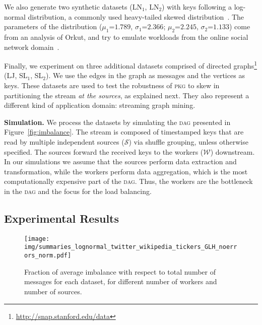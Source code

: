 \documentclass[10pt,conference,letterpaper]{IEEEtran}
\newcommand{\spara}[1]{\smallskip\noindent\textbf{#1}}
\newcommand{\dagr}{\textsc{dag}\xspace}
\newcommand{\pkgs}{\textsc{pkg}\xspace}
\newcommand{\sources}{\ensuremath{\mathcal{S}}\xspace}
\newcommand{\workers}{\ensuremath{\mathcal{W}}\xspace}
\begin{document}
We also generate two synthetic datasets (LN$_1$, LN$_2$) with keys following a log-normal distribution, a commonly used heavy-tailed skewed distribution~\citep{talwar2007weightedcase}.
The parameters of the distribution ($\mu_1$=$1.789$, $\sigma_1$=$2.366$; $\mu_2$=$2.245$, $\sigma_2$=$1.133$) come from an analysis of Orkut, and try to emulate workloads from the online social network domain~\cite{benevenuto09characterizingusers}.


Finally, we experiment on three additional datasets comprised of directed graphs\footnote{\url{http://snap.stanford.edu/data}} (LJ, SL$_1$, SL$_2$).
We use the edges in the graph as messages and the vertices as keys. These datasets are used to test the robustness of \pkgs to skew in partitioning the stream \emph{at the sources}, as explained next.
They also represent a different kind of application domain: streaming graph mining.






\spara{Simulation.}
We process the datasets by simulating the \dagr presented in Figure~\ref{fig:imbalance}.
The stream is composed of timestamped keys that are read by multiple independent sources (\sources) via shuffle grouping, unless otherwise specified.
The sources forward the received keys to the workers (\workers) downstream.
In our simulations we assume that the sources perform data extraction and transformation, while the workers perform data aggregation, which is the most computationally expensive part of the \dagr.
Thus, the workers are the bottleneck in the \dagr and the focus for the load balancing.







\subsection{Experimental Results}






\begin{figure*}[t]
\begin{center}
	\texttt{[image: img/summaries\_lognormal\_twitter\_wikipedia\_tickers\_GLH\_noerrors\_norm.pdf]}
	\caption{Fraction of average imbalance with respect to total number of messages for each dataset, for different number of workers and number of sources.} \label{fig:avg-GLH}
\end{center}
\end{figure*}
\end{document}
